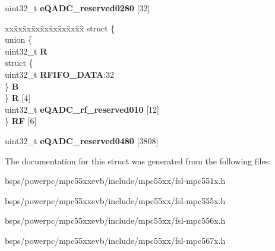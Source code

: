 \begin{DoxyCompactItemize}
\begin{tabbing}
\end{tabbing}\item 
\mbox{\label{structEQADC__tag_a919dc8ef1f03e9becaaa838caf473618}} 
uint32\+\_\+t {\bfseries e\+Q\+A\+D\+C\+\_\+reserved0280} \mbox{[}32\mbox{]}
\item 
\mbox{\label{structEQADC__tag_a0e3922619477bef9d5455d35b053e117}} 
\begin{tabbing}
xx\=xx\=xx\=xx\=xx\=xx\=xx\=xx\=xx\=\kill
struct \{\\
\>union \{\\
\>\>uint32\_t {\bfseries R}\\
\>\>struct \{\\
\>\>\>uint32\_t {\bfseries RFIFO\_DATA}:32\\
\>\>\} {\bfseries B}\\
\>\} {\bfseries R} \mbox{[}4\mbox{]}\\
\>uint32\_t {\bfseries eQADC\_rf\_reserved010} \mbox{[}12\mbox{]}\\
\} {\bfseries RF} \mbox{[}6\mbox{]}\\

\end{tabbing}\item 
\mbox{\label{structEQADC__tag_a5e15bba28d6468a6f798c0a53f0726ec}} 
uint32\+\_\+t {\bfseries e\+Q\+A\+D\+C\+\_\+reserved0480} \mbox{[}3808\mbox{]}
\end{DoxyCompactItemize}


The documentation for this struct was generated from the following files\+:\begin{DoxyCompactItemize}
\item 
bsps/powerpc/mpc55xxevb/include/mpc55xx/fsl-\/mpc551x.\+h\item 
bsps/powerpc/mpc55xxevb/include/mpc55xx/fsl-\/mpc555x.\+h\item 
bsps/powerpc/mpc55xxevb/include/mpc55xx/fsl-\/mpc556x.\+h\item 
bsps/powerpc/mpc55xxevb/include/mpc55xx/fsl-\/mpc567x.\+h\end{DoxyCompactItemize}
